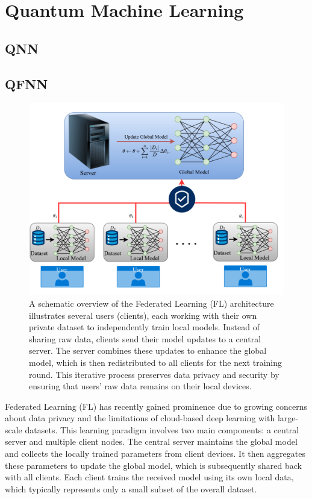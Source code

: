 \documentclass[10pt]{article}
\begin{document}
\section{Quantum Machine Learning}
\subsection{QNN}




\subsection{QFNN}
\begin{figure}[h!]
	\centering
	\includegraphics[height = 0.30\textheight]{img/FL_model.png}
	\caption{A schematic overview of the Federated Learning (FL) architecture illustrates several users (clients), each working with their own private dataset to independently train local models. Instead of sharing raw data, clients send their model updates to a central server. The server combines these updates to enhance the global model, which is then redistributed to all clients for the next training round. This iterative process preserves data privacy and security by ensuring that users' raw data remains on their local devices.}
\end{figure}
Federated Learning (FL) has recently gained prominence due to growing concerns about data privacy and the limitations of cloud-based deep learning with large-scale datasets. This learning paradigm involves two main components: a central server and multiple client nodes. The central server maintains the global model and collects the locally trained parameters from client devices. It then aggregates these parameters to update the global model, which is subsequently shared back with all clients. Each client trains the received model using its own local data, which typically represents only a small subset of the overall dataset.
\end{document}
